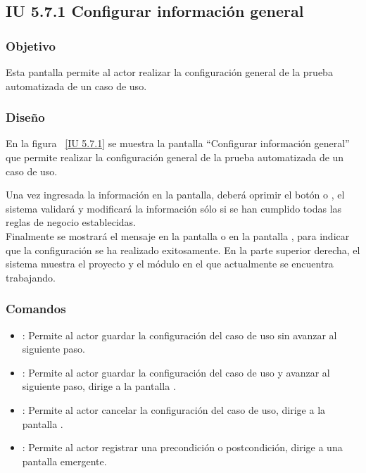 \newpage 
\subsection{IU 5.7.1 Configurar información general}

\subsubsection{Objetivo}
	
	Esta pantalla permite al actor realizar la configuración general de la prueba automatizada de un caso de uso.

\subsubsection{Diseño}

    En la figura ~\ref{IU 5.7.1} se muestra la pantalla ``Configurar información general'' que permite realizar la configuración general de la prueba automatizada de un caso de uso.
    
    Una vez ingresada la información en la pantalla, deberá oprimir el botón  o , el sistema validará y modificará la información sólo si se han cumplido todas las reglas de negocio establecidas.  \\
    
    Finalmente se mostrará el mensaje  en la pantalla  o en la pantalla , para indicar que la configuración se ha realizado exitosamente.
	En la parte superior derecha, el sistema muestra el proyecto y el módulo en el que actualmente se encuentra trabajando.
	   


    


\subsubsection{Comandos}
\begin{itemize}
	\item {}: Permite al actor guardar la configuración del caso de uso sin avanzar al siguiente paso.
	\item {}: Permite al actor guardar la configuración del caso de uso y avanzar al siguiente paso, dirige a la pantalla .
	\item {}: Permite al actor cancelar la configuración del caso de uso, dirige a la pantalla .
	\item \btnRegistrar: Permite al actor registrar una precondición o postcondición, dirige a una pantalla emergente.
\end{itemize}

